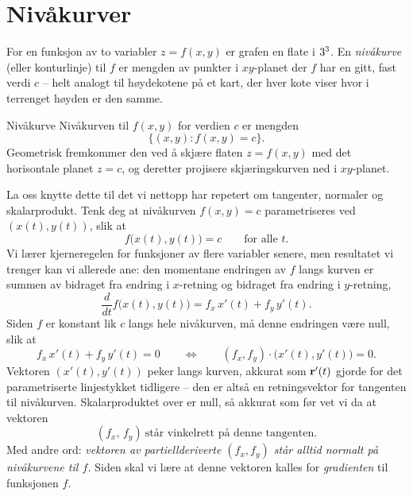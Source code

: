 \section{Nivåkurver}
\label{sec:nivakurver-rep}

For en funksjon av to variabler $z=f(x,y)$ er grafen en flate i $3^3$. En \emph{nivåkurve} (eller konturlinje) til $f$ er mengden av punkter i $xy$-planet der $f$ har en gitt, fast verdi $c$ -- helt analogt til høydekotene på et kart, der hver kote viser hvor i terrenget høyden er den samme.

\begin{defn}{Nivåkurve}
Nivåkurven til $f(x,y)$ for verdien $c$ er mengden
\[
\{(x,y) : f(x,y)=c\}.
\]
Geometrisk fremkommer den ved å skjære flaten $z=f(x,y)$ med det horisontale planet $z=c$, og deretter projisere skjæringskurven ned i $xy$-planet.
\end{defn}

La oss knytte dette til det vi nettopp har repetert om tangenter, normaler og skalarprodukt. Tenk deg at nivåkurven $f(x,y)=c$ parametriseres ved $(x(t),y(t))$, slik at
\[
f\bigl(x(t),y(t)\bigr) = c \qquad \text{for alle } t.
\]
Vi lærer kjerneregelen for funksjoner av flere variabler senere, men resultatet vi trenger kan vi allerede ane: den momentane endringen av $f$ langs kurven er summen av bidraget fra endring i $x$-retning og bidraget fra endring i $y$-retning,
\[
\frac{d}{dt}f\bigl(x(t),y(t)\bigr) = f_x\,x'(t) + f_y\,y'(t).
\]
Siden $f$ er konstant lik $c$ langs hele nivåkurven, må denne endringen være null, slik at
\[
f_x\,x'(t) + f_y\,y'(t) = 0 \qquad\Longleftrightarrow\qquad (f_x,f_y)\cdot\bigl(x'(t),y'(t)\bigr) = 0.
\]
Vektoren $(x'(t),y'(t))$ peker langs kurven, akkurat som $\mathbf{r}'(t)$ gjorde for det parametriserte linjestykket tidligere -- den er altså en retningsvektor for tangenten til nivåkurven. Skalarproduktet over er null, så akkurat som før vet vi da at vektoren
\[
(f_x,\,f_y) \ \text{står vinkelrett på denne tangenten.}
\]
Med andre ord: \emph{vektoren av partiellderiverte $(f_x,f_y)$ står alltid normalt på nivåkurvene til $f$.} Siden skal vi lære at denne vektoren kalles for \textit{gradienten} til funksjonen $f$. 

